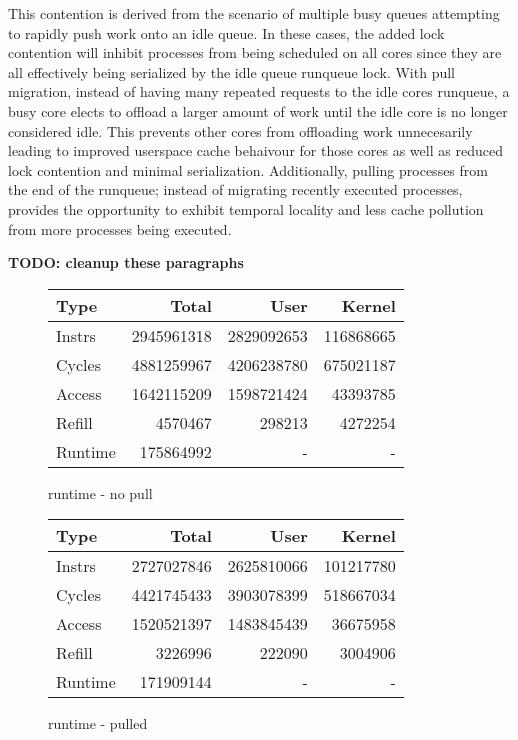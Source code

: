 \documentclass[11pt]{article}
\begin{document}
This contention is derived from the scenario of multiple busy queues attempting to rapidly push work onto an idle queue.  In these cases, the added lock contention will inhibit processes from being scheduled on all cores since they are all effectively being serialized by the idle queue runqueue lock.  With pull migration, instead of having many repeated requests to the idle cores runqueue, a busy core elects to offload a larger amount of work until the idle core is no longer considered idle.  This prevents other cores from offloading work unnecesarily leading to improved userspace cache behaivour for those cores as well as reduced lock contention and minimal serialization.  Additionally, pulling processes from the end of the runqueue; instead of migrating recently executed processes, provides the opportunity to exhibit temporal locality and less cache pollution from more processes being executed. 

\textbf{TODO: cleanup these paragraphs}

\begin{figure*}[h]
	\centering
	\begin{subtable}[b]{.48\linewidth}
		\centering                 
		\begin{tabular}{ l|rrr }
			Type    & Total      & User       & Kernel    \\
			\hline
			Instrs  & 2945961318 & 2829092653 & 116868665 \\ 
			Cycles  & 4881259967 & 4206238780 & 675021187 \\ 
			Access  & 1642115209 & 1598721424 & 43393785  \\ 
			Refill  & 4570467    & 298213     & 4272254   \\ 
			Runtime & 175864992  & -          & -         \\
			\hline
		\end{tabular}
		\caption{runtime - no pull}    
	\end{subtable}
	\hfill
	\begin{subtable}[b]{.48\linewidth}
		\centering
		\begin{tabular}{ l|rrr }
			Type    & Total      & User       & Kernel    \\
			\hline
			Instrs  & 2727027846 & 2625810066 & 101217780 \\ 
			Cycles  & 4421745433 & 3903078399 & 518667034 \\ 
			Access  & 1520521397 & 1483845439 & 36675958  \\ 
			Refill  & 3226996    & 222090     & 3004906   \\ 
			Runtime & 171909144  & -          & -         \\
			\hline
		\end{tabular}
		\caption{runtime - pulled}
	\end{subtable}
\end{figure*}
\end{document}
